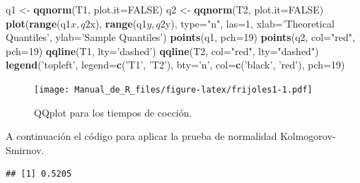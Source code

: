 \documentclass[10pt,]{krantz}
\makeatletter
\newenvironment{Shaded}{\begin{snugshade}}{\end{snugshade}}
\newcommand{\KeywordTok}[1]{\textcolor[rgb]{0.13,0.29,0.53}{\textbf{{#1}}}}
\newcommand{\DataTypeTok}[1]{\textcolor[rgb]{0.13,0.29,0.53}{{#1}}}
\newcommand{\DecValTok}[1]{\textcolor[rgb]{0.00,0.00,0.81}{{#1}}}
\newcommand{\StringTok}[1]{\textcolor[rgb]{0.31,0.60,0.02}{{#1}}}
\newcommand{\CommentTok}[1]{\textcolor[rgb]{0.56,0.35,0.01}{\textit{{#1}}}}
\newcommand{\OtherTok}[1]{\textcolor[rgb]{0.56,0.35,0.01}{{#1}}}
\newcommand{\NormalTok}[1]{{#1}}
\newenvironment{kframe}{%
\medskip{}
\setlength{\fboxsep}{.8em}
 \def\at@end@of@kframe{}%
 \ifinner\ifhmode%
  \def\at@end@of@kframe{\end{minipage}}%
  \begin{minipage}{\columnwidth}%
 \fi\fi%
 \def\FrameCommand##1{\hskip\@totalleftmargin \hskip-\fboxsep
 \colorbox{shadecolor}{##1}\hskip-\fboxsep
     \hskip-\linewidth \hskip-\@totalleftmargin \hskip\columnwidth}%
 \MakeFramed {\advance\hsize-\width
   \@totalleftmargin\z@ \linewidth\hsize
   \@setminipage}}%
 {\par\unskip\endMakeFramed%
 \at@end@of@kframe}
\renewenvironment{Shaded}{\begin{kframe}}{\end{kframe}}
\makeatother
\begin{document}
\begin{Shaded}
\begin{Highlighting}[]
\NormalTok{q1 <-}\StringTok{ }\KeywordTok{qqnorm}\NormalTok{(T1, }\DataTypeTok{plot.it=}\OtherTok{FALSE}\NormalTok{)}
\NormalTok{q2 <-}\StringTok{ }\KeywordTok{qqnorm}\NormalTok{(T2, }\DataTypeTok{plot.it=}\OtherTok{FALSE}\NormalTok{)}
\KeywordTok{plot}\NormalTok{(}\KeywordTok{range}\NormalTok{(q1$x, q2$x), }\KeywordTok{range}\NormalTok{(q1$y, q2$y), }\DataTypeTok{type=}\StringTok{"n"}\NormalTok{, }\DataTypeTok{las=}\DecValTok{1}\NormalTok{,}
     \DataTypeTok{xlab=}\StringTok{'Theoretical Quantiles'}\NormalTok{, }\DataTypeTok{ylab=}\StringTok{'Sample Quantiles'}\NormalTok{)}
\KeywordTok{points}\NormalTok{(q1, }\DataTypeTok{pch=}\DecValTok{19}\NormalTok{)}
\KeywordTok{points}\NormalTok{(q2, }\DataTypeTok{col=}\StringTok{"red"}\NormalTok{, }\DataTypeTok{pch=}\DecValTok{19}\NormalTok{)}
\KeywordTok{qqline}\NormalTok{(T1, }\DataTypeTok{lty=}\StringTok{'dashed'}\NormalTok{)}
\KeywordTok{qqline}\NormalTok{(T2, }\DataTypeTok{col=}\StringTok{"red"}\NormalTok{, }\DataTypeTok{lty=}\StringTok{"dashed"}\NormalTok{)}
\KeywordTok{legend}\NormalTok{(}\StringTok{'topleft'}\NormalTok{, }\DataTypeTok{legend=}\KeywordTok{c}\NormalTok{(}\StringTok{'T1'}\NormalTok{, }\StringTok{'T2'}\NormalTok{), }\DataTypeTok{bty=}\StringTok{'n'}\NormalTok{,}
       \DataTypeTok{col=}\KeywordTok{c}\NormalTok{(}\StringTok{'black'}\NormalTok{, }\StringTok{'red'}\NormalTok{), }\DataTypeTok{pch=}\DecValTok{19}\NormalTok{)}
\end{Highlighting}
\end{Shaded}

\begin{figure}[htbp]
\centering
\texttt{[image: Manual\_de\_R\_files/figure-latex/frijoles1-1.pdf]}
\caption{\label{fig:frijoles1}QQplot para los tiempos de cocción.}
\end{figure}

A continuación el código para aplicar la prueba de normalidad
Kolmogorov-Smirnov.

\begin{Shaded}
\end{Shaded}

\begin{verbatim}
## [1] 0.5205
\end{verbatim}
\end{document}
